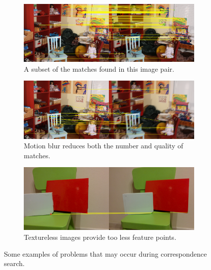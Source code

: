 \begin{figure}
	\centering
	\begin{subfigure}{\textwidth}
		\centering
		\includegraphics[width=\textwidth]{img/good_stereo}
		\caption{A subset of the matches found in this image pair.}\label{fig:good_stereo}
	\end{subfigure}
	\begin{subfigure}{\textwidth}
		\centering
		\includegraphics[width=\textwidth]{img/motion_blur}
		\caption{Motion blur reduces both the number and quality of matches.}\label{fig:motion_blur}
	\end{subfigure}
	\begin{subfigure}{\textwidth}
		\centering
		\includegraphics[width=\textwidth]{img/textureless_stereo}
		\caption{Textureless images provide too less feature points.}\label{fig:textureless}
	\end{subfigure}
	\caption{Some examples of problems that may occur during correspondence search.}\label{fig:matching_problems}
\end{figure}

